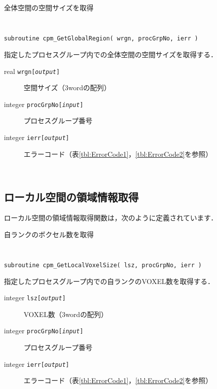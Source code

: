 \begin{spacing}{0.8}
\begin{itembox}[l]{全体空間の空間サイズを取得}
{\tt
\begin{verbatim}
subroutine cpm_GetGlobalRegion( wrgn, procGrpNo, ierr )
\end{verbatim}
}
指定したプロセスグループ内での全体空間の空間サイズを取得する．
\begin{description}
\item[real    {\tt wrgn[{\it output}]}] 空間サイズ（3wordの配列）
\item[integer {\tt procGrpNo[{\it input}]}] プロセスグループ番号
\item[integer {\tt ierr[{\it output}]}] エラーコード（表\ref{tbl:ErrorCode1}，\ref{tbl:ErrorCode2}を参照）
\end{description}
\end{itembox}\\
\end{spacing}


\clearpage


\subsection{ローカル空間の領域情報取得}
\label{localInfoF}
ローカル空間の領域情報取得関数は，次のように定義されています．\\

\begin{spacing}{0.8}
\begin{itembox}[l]{自ランクのボクセル数を取得}
{\tt
\begin{verbatim}
subroutine cpm_GetLocalVoxelSize( lsz, procGrpNo, ierr )
\end{verbatim}
}
指定したプロセスグループ内での自ランクのVOXEL数を取得する．
\begin{description}
\item[integer {\tt lsz[{\it output}]}] VOXEL数（3wordの配列）
\item[integer {\tt procGrpNo[{\it input}]}] プロセスグループ番号
\item[integer {\tt ierr[{\it output}]}] エラーコード（表\ref{tbl:ErrorCode1}，\ref{tbl:ErrorCode2}を参照）
\end{description}
\end{itembox}\\
\end{spacing}

